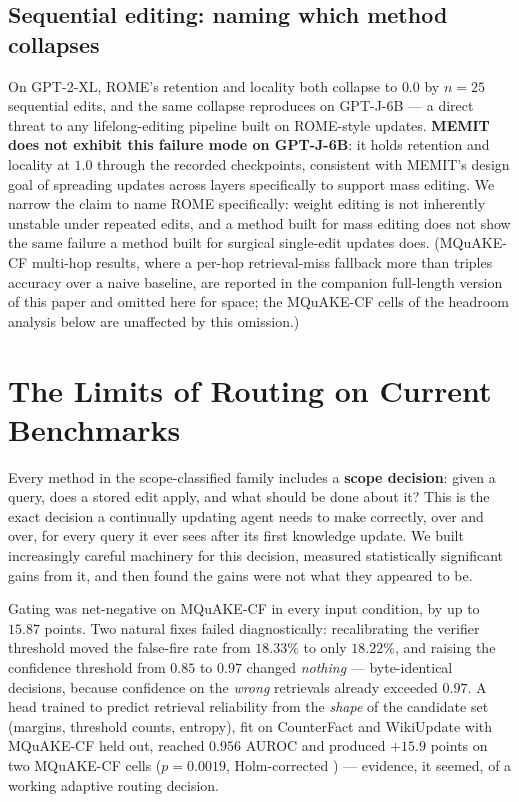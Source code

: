 \documentclass{article}
\begin{document}
\subsection{Sequential editing: naming which method collapses}
\label{sec:sequential}

On GPT-2-XL, ROME's retention and locality both collapse to $0.0$ by
$n{=}25$ sequential edits, and the same collapse reproduces on GPT-J-6B ---
a direct threat to any lifelong-editing pipeline built on ROME-style
updates. \textbf{MEMIT does not exhibit this failure mode on GPT-J-6B}: it
holds retention and locality at $1.0$ through the recorded checkpoints,
consistent with MEMIT's design goal of spreading updates across layers
specifically to support mass editing. We narrow the claim to name ROME
specifically: weight editing is not inherently unstable under repeated
edits, and a method built for mass editing does not show the same failure a
method built for surgical single-edit updates does. (MQuAKE-CF multi-hop
results, where a per-hop retrieval-miss fallback more than triples accuracy
over a naive baseline, are reported in the companion full-length version of
this paper and omitted here for space; the MQuAKE-CF cells of the headroom
analysis below are unaffected by this omission.)

\section{The Limits of Routing on Current Benchmarks}
\label{sec:headroom}

Every method in the scope-classified family includes a \textbf{scope
decision}: given a query, does a stored edit apply, and what should be done
about it? This is the exact decision a continually updating agent needs to
make correctly, over and over, for every query it ever sees after its first
knowledge update. We built increasingly careful machinery for this decision,
measured statistically significant gains from it, and then found the gains
were not what they appeared to be.

Gating was net-negative on MQuAKE-CF in every input condition, by up to
$15.87$ points. Two natural fixes failed diagnostically: recalibrating the
verifier threshold moved the false-fire rate from $18.33\%$ to only
$18.22\%$, and raising the confidence threshold from $0.85$ to $0.97$
changed \emph{nothing} --- byte-identical decisions, because confidence on
the \emph{wrong} retrievals already exceeded $0.97$. A head trained to
predict retrieval reliability from the \emph{shape} of the candidate set
(margins, threshold counts, entropy), fit on CounterFact and WikiUpdate
with MQuAKE-CF held out, reached $0.956$ AUROC and produced $+15.9$ points
on two MQuAKE-CF cells ($p{=}0.0019$, Holm-corrected \citep{holm1979}) ---
evidence, it seemed, of a working adaptive routing decision.
\end{document}
